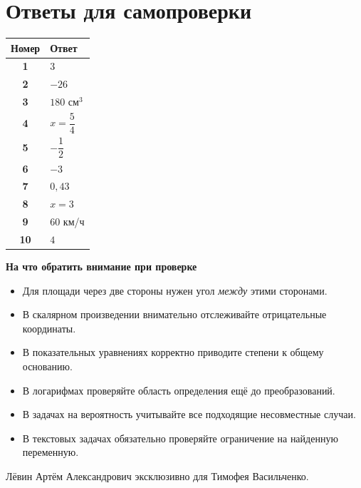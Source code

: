 \documentclass[a4paper,12pt]{article}
\begin{document}
\section*{\color{darkaccent}Ответы для самопроверки}
\renewcommand{\arraystretch}{1.55}
\begin{center}
\begin{tabularx}{0.96\linewidth}{@{}>{\bfseries}c X@{}}
\toprule
Номер & Ответ \\
\midrule
1 & $3$ \\
2 & $-26$ \\
3 & $180$ см$^3$ \\
4 & $x=\dfrac54$ \\
5 & $-\dfrac12$ \\
6 & $-3$ \\
7 & $0{,}43$ \\
8 & $x=3$ \\
9 & $60$ км/ч \\
10 & $4$ \\
\bottomrule
\end{tabularx}
\end{center}
\vspace{10mm}
\textbf{На что обратить внимание при проверке}\par
\begin{itemize}
\item Для площади через две стороны нужен угол \emph{между} этими сторонами.
\item В скалярном произведении внимательно отслеживайте отрицательные координаты.
\item В показательных уравнениях корректно приводите степени к общему основанию.
\item В логарифмах проверяйте область определения ещё до преобразований.
\item В задачах на вероятность учитывайте все подходящие несовместные случаи.
\item В текстовых задачах обязательно проверяйте ограничение на найденную переменную.
\end{itemize}
\vfill
{\small\color{textgray}Лёвин Артём Александрович эксклюзивно для Тимофея Васильченко.}
\end{document}
